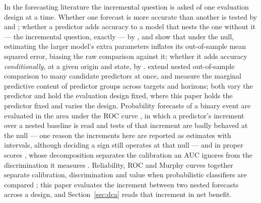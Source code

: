 \documentclass[11pt,3p,review,authoryear]{elsarticle}
\theoremstyle{definition}
\begin{document}
In the forecasting literature the incremental question is asked of one
evaluation design at a time. Whether one forecast is more accurate than
another is tested by \citet{diebold1995comparing} and
\citet{west1996asymptotic}; whether a predictor adds accuracy to a model that
nests the one without it --- the incremental question, exactly --- by
\citet{clark2001nested}, and \citet{clark2007approximately} show that under
the null, estimating the larger model's extra parameters inflates its
out-of-sample mean squared error, biasing the raw comparison against it;
whether it adds accuracy \emph{conditionally}, at a given origin and state,
by \citet{giacomini2006conditional}. \citet{gonzalo2024outofsample} extend
nested out-of-sample comparison to many candidate predictors at once, and
\citet{liu2024marginal} measure the marginal predictive content of predictor
groups across targets and horizons; both vary the predictor and hold the
evaluation design fixed, where this paper holds the predictor fixed and
varies the design. Probability forecasts of a binary event are evaluated in
the area under the ROC curve \citep{lahiri2013evaluating}, in which a
predictor's increment over a nested baseline is read
\citep{liu2016recessions} and tests of that increment are badly behaved at
the null \citep{demler2012misuse,pepe2013testing} --- one reason the
increments here are reported as estimates with intervals, although deciding
a sign still operates at that null --- and in proper scores
\citep{brier1950verification,gneiting2007scoring}, whose decomposition
separates the calibration an AUC ignores from the discrimination it measures
\citep{dimitriadis2021stable}. Reliability, ROC and Murphy curves together
separate calibration, discrimination and value when probabilistic
classifiers are compared \citep{dimitriadis2024triptych}; this paper evaluates the
increment between two nested forecasts across a design, and
Section~\ref{sec:dca} reads that increment in net benefit.
\end{document}
